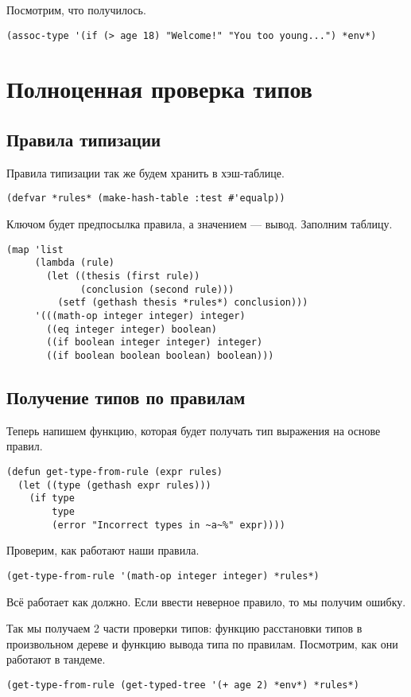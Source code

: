 \documentclass[a4paper,11pt]{article}
\begin{document}
Посмотрим, что получилось.
\begin{verbatim}
(assoc-type '(if (> age 18) "Welcome!" "You too young...") *env*)
\end{verbatim}

\section{Полноценная проверка типов}
\label{sec:orga72b88a}
\subsection{Правила типизации}
\label{sec:orge30dc58}
Правила типизации так же будем хранить в хэш-таблице.
\begin{verbatim}
(defvar *rules* (make-hash-table :test #'equalp))
\end{verbatim}

Ключом будет предпосылка правила, а значением — вывод. Заполним таблицу.
\begin{verbatim}
(map 'list
     (lambda (rule)
       (let ((thesis (first rule))
             (conclusion (second rule)))
         (setf (gethash thesis *rules*) conclusion)))
     '(((math-op integer integer) integer)
       ((eq integer integer) boolean)
       ((if boolean integer integer) integer)
       ((if boolean boolean boolean) boolean)))
\end{verbatim}

\subsection{Получение типов по правилам}
\label{sec:org12a4b15}
Теперь напишем функцию, которая будет получать тип выражения на основе правил.
\begin{verbatim}
(defun get-type-from-rule (expr rules)
  (let ((type (gethash expr rules)))
    (if type
        type
        (error "Incorrect types in ~a~%" expr))))
\end{verbatim}

Проверим, как работают наши правила.
\begin{verbatim}
(get-type-from-rule '(math-op integer integer) *rules*)
\end{verbatim}

Всё работает как должно. Если ввести неверное правило, то мы получим ошибку.

Так мы получаем 2 части проверки типов: функцию расстановки типов в произвольном дереве и функцию вывода типа по правилам. Посмотрим, как они работают в тандеме.
\begin{verbatim}
(get-type-from-rule (get-typed-tree '(+ age 2) *env*) *rules*)
\end{verbatim}
\end{document}
